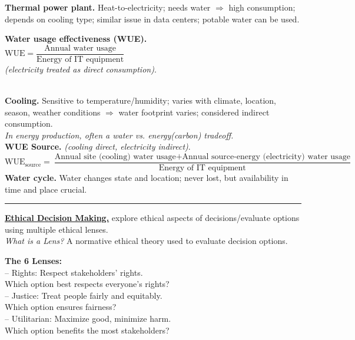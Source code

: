 \documentclass[8pt, a4paper]{extarticle}
\makeatletter
\renewcommand{\hline}{\noalign{\vskip 2px}\hrule\@height\arrayrulewidth\@width\linewidth\noalign{\vskip 2px}}
\makeatother
\begin{document}
\begin{minipage}[t]{0.48\textwidth}
{\begin{minipage}[t]{1\textwidth}
			\begin{minipage}[htp]{0.55\textwidth}
				\textbf{Thermal power plant.} Heat-to-electricity; needs water $\Rightarrow$ high consumption; depends on cooling type;
				similar issue in data centers; potable water can be used.
			\end{minipage}\hfill
			\begin{minipage}[htp]{0.44\textwidth}
				\textbf{Water usage effectiveness (WUE).}\\
				$\mathrm{WUE}=\dfrac{\text{Annual water usage}}{\text{Energy of IT equipment}}$\\
				\textit{(electricity treated as direct consumption)}.
			\end{minipage}\\
			\textbf{Cooling.} Sensitive to temperature/humidity; varies with climate, location, season, weather conditions
			$\Rightarrow$ water footprint varies; considered indirect consumption.\\
			\textit{In energy production, often a water vs. energy(carbon) tradeoff.}\\
			\textbf{WUE Source.} \textit{(cooling direct, electricity indirect)}.\\
			$\mathrm{WUE_{source}}=\dfrac{\text{Annual site (cooling) water usage}+\text{Annual source-energy (electricity) water usage}}{\text{Energy of IT equipment}}$\\
			\textbf{Water cycle.} Water changes state and location; never lost, but availability in time and place crucial.
			\hline
			\ul{\textbf{Ethical Decision Making.}} explore ethical aspects of decisions/evaluate options using multiple ethical lenses.\\
			\textit{What is a Lens?} A normative ethical theory used to evaluate decision options.\\
			\begin{minipage}[htp]{0.48\textwidth}
				\textbf{The 6 Lenses:}\\
				– Rights: Respect stakeholders’ rights.\\
				Which option best respects everyone’s rights?\\
				– Justice: Treat people fairly and equitably.\\
				Which option ensures fairness?\\
				– Utilitarian: Maximize good, minimize harm.\\
				Which option benefits the most stakeholders?
			\end{minipage}
			\begin{minipage}[htp]{0.48\textwidth}

\end{minipage}
\end{minipage}}
\end{minipage}
\end{document}
